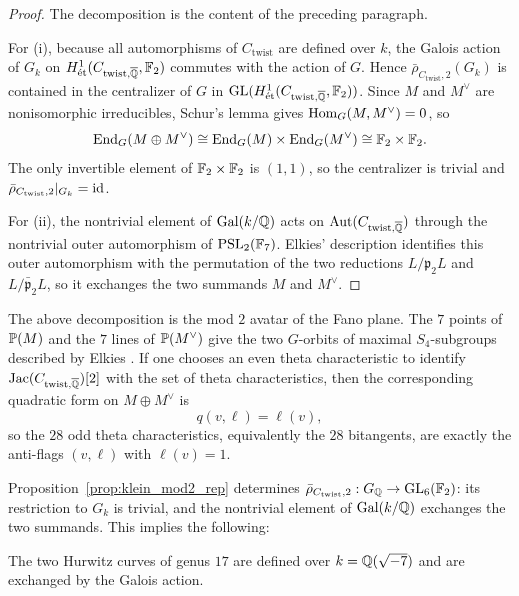 \documentclass[main.tex]{subfiles}
\begin{document}
\begin{proof}
The decomposition is the content of the preceding paragraph.
\par
For (i), because all automorphisms of $C_{\mathrm{twist}}$ are defined over $k$, the Galois action of $G_k$ on $H^1_{\et}(C_{\mathrm{twist},\ol{\Q}}, \FF_2)$ commutes with the action of $G$. Hence $\bar{\rho}_{C_{\mathrm{twist}},2}(G_k)$ is contained in the centralizer of $G$ in $\GL(H^1_{\et}(C_{\mathrm{twist},\ol{\Q}}, \FF_2))$. Since $M$ and $M^{\vee}$ are nonisomorphic irreducibles, Schur's lemma gives $\Hom_G(M, M^{\vee}) = 0$, so
\[
\End_G(M \oplus M^{\vee}) \cong \End_G(M) \times \End_G(M^{\vee}) \cong \FF_2 \times \FF_2.
\]
The only invertible element of $\FF_2 \times \FF_2$ is $(1,1)$, so the centralizer is trivial and $\bar{\rho}_{C_{\mathrm{twist}},2}|_{G_k} = \id$.
\par
For (ii), the nontrivial element of $\Gal(k/\Q)$ acts on $\Aut(C_{\mathrm{twist},\ol{\Q}})$ through the nontrivial outer automorphism of $\PSL_2(\FF_7)$. Elkies' description identifies this outer automorphism with the permutation of the two reductions $L / \mathfrak{p}_2 L$ and $L / \bar{\mathfrak{p}}_2 L$, so it exchanges the two summands $M$ and $M^{\vee}$.
\end{proof}

\begin{rmk}
The above decomposition is the mod $2$ avatar of the Fano plane. The $7$ points of $\P(M)$ and the $7$ lines of $\P(M^{\vee})$ give the two $G$-orbits of maximal $S_4$-subgroups described by Elkies \cite[\S2.2]{elkies:klein_quartic}. If one chooses an even theta characteristic to identify $\Jac(C_{\mathrm{twist},\ol{\Q}})[2]$ with the set of theta characteristics, then the corresponding quadratic form on $M \oplus M^{\vee}$ is
\[
q(v,\ell) = \ell(v),
\]
so the $28$ odd theta characteristics, equivalently the $28$ bitangents, are exactly the anti-flags $(v,\ell)$ with $\ell(v) = 1$.
\end{rmk}

Proposition~\ref{prop:klein_mod2_rep} determines $\bar{\rho}_{C_{\mathrm{twist}},2} : G_{\Q} \to \GL_6(\FF_2)$: its restriction to $G_k$ is trivial, and the nontrivial element of $\Gal(k/\Q)$ exchanges the two summands. This implies the following:

\begin{theorem}
The two Hurwitz curves of genus $17$ are defined over $k = \Q(\sqrt{-7})$ and are exchanged by the Galois action.
\end{theorem}
\end{document}
